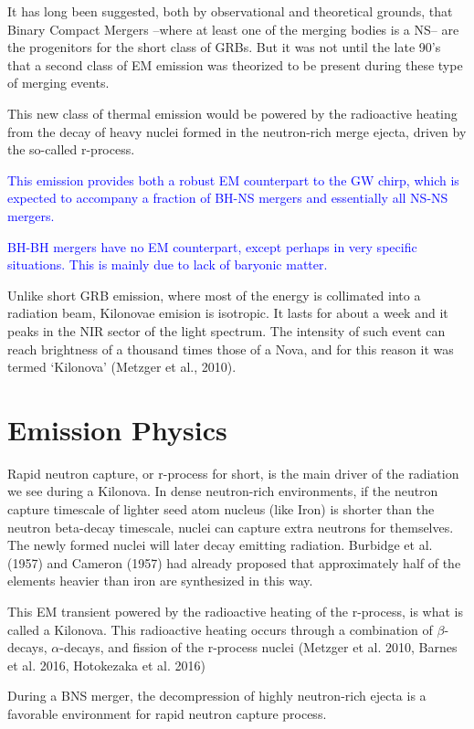 It has long been suggested, both by observational and theoretical grounds, that Binary Compact Mergers --where at least one of the merging bodies is a NS-- are the progenitors for the short class of GRBs. But it was not until the late 90's that a second class of EM emission was theorized to be present during these type of merging events.

This new class of thermal emission would be powered by the radioactive heating from the decay of heavy nuclei formed in the neutron-rich merge ejecta, driven by the so-called r-process.

\textcolor{blue}{This emission provides both a robust EM counterpart to the GW chirp, which is expected to accompany a fraction of BH-NS mergers and essentially all NS-NS mergers.}

\textcolor{blue}{BH-BH mergers have no EM counterpart, except perhaps in very specific situations. This is mainly due to lack of baryonic matter.}

Unlike short GRB emission, where most of the energy is collimated into a radiation beam, Kilonovae emision is isotropic.
It lasts for about a week and it peaks in the NIR sector of the light spectrum. The intensity of such event can reach brightness of a thousand times those of a Nova, and for this reason it was termed `Kilonova' (Metzger et al., 2010).

\section{Emission Physics}

Rapid neutron capture, or r-process for short, is the main driver of the radiation we see during a Kilonova.
In dense neutron-rich environments, if the neutron capture timescale of lighter seed atom nucleus (like Iron) is shorter than the neutron beta-decay timescale, nuclei can capture extra neutrons for themselves.
The newly formed nuclei will later decay emitting radiation.
Burbidge et al. (1957) and Cameron (1957) had already proposed that approximately half of the elements heavier than iron are synthesized in this way.

This EM transient powered by the radioactive heating of the r-process, is what is called a Kilonova.
This radioactive heating occurs through a combination of $\beta$-decays, $\alpha$-decays, and fission of the r-process nuclei (Metzger et al. 2010, Barnes et al. 2016, Hotokezaka et al. 2016)

During a BNS merger, the decompression of highly neutron-rich ejecta is a favorable environment for rapid neutron capture process.

